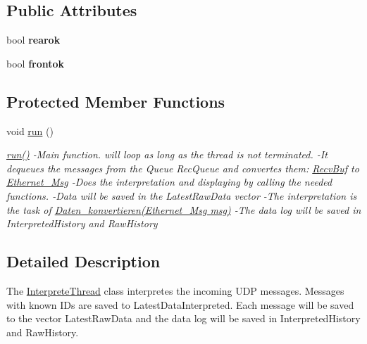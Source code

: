 \subsection*{Public Attributes}
\begin{DoxyCompactItemize}
\item 
\hypertarget{class_interprete_thread_ac7fbde461d6471d864605143cd77b27d}{}bool {\bfseries rearok}\label{class_interprete_thread_ac7fbde461d6471d864605143cd77b27d}

\item 
\hypertarget{class_interprete_thread_aaf773375f45a30ea052af1a05a31b9df}{}bool {\bfseries frontok}\label{class_interprete_thread_aaf773375f45a30ea052af1a05a31b9df}

\end{DoxyCompactItemize}
\subsection*{Protected Member Functions}
\begin{DoxyCompactItemize}
\item 
\hypertarget{class_interprete_thread_aa24b72df0d69cf668ae26919a6cafc58}{}void \hyperlink{class_interprete_thread_aa24b72df0d69cf668ae26919a6cafc58}{run} ()\label{class_interprete_thread_aa24b72df0d69cf668ae26919a6cafc58}

\begin{DoxyCompactList}\small\item\em \hyperlink{class_interprete_thread_aa24b72df0d69cf668ae26919a6cafc58}{run()} -\/\+Main function. will loop as long as the thread is not terminated. -\/\+It dequeues the messages from the Queue Rec\+Queue and convertes them\+: \hyperlink{struct_recv_buf}{Recv\+Buf} to \hyperlink{struct_ethernet___msg}{Ethernet\+\_\+\+Msg} -\/\+Does the interpretation and displaying by calling the needed functions. -\/\+Data will be saved in the Latest\+Raw\+Data vector -\/\+The interpretation is the task of \hyperlink{class_interprete_thread_a9e2e7ed3a9608daa29393850ce380ffc}{Daten\+\_\+konvertieren(\+Ethernet\+\_\+\+Msg msg)} -\/\+The data log will be saved in Interpreted\+History and Raw\+History \end{DoxyCompactList}\end{DoxyCompactItemize}


\subsection{Detailed Description}
The \hyperlink{class_interprete_thread}{Interprete\+Thread} class interpretes the incoming U\+D\+P messages. Messages with known I\+D\textquotesingle{}s are saved to Latest\+Data\+Interpreted. Each message will be saved to the vector Latest\+Raw\+Data and the data log will be saved in Interpreted\+History and Raw\+History. 

